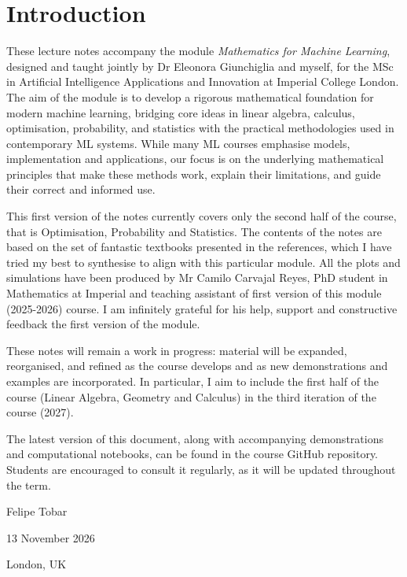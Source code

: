 

\section{Introduction}
\label{cap:intro}


These lecture notes accompany the module \emph{Mathematics for Machine Learning}, designed and taught jointly by Dr Eleonora Giunchiglia and myself, for the MSc in Artificial Intelligence Applications and Innovation at Imperial College London. The aim of the module is to develop a rigorous mathematical foundation for modern machine learning, bridging core ideas in linear algebra, calculus,  optimisation, probability, and statistics with the practical methodologies used in contemporary ML systems. While many ML courses emphasise models, implementation and  applications, our focus is on the underlying mathematical principles that make these methods work, explain their limitations, and guide their correct and informed use.

This first version of the notes currently covers only the second half of the course, that is Optimisation, Probability and Statistics. The contents of the notes are based on the set of fantastic textbooks presented in the references, which I have tried my best to synthesise to align with this particular module. All the plots and simulations have been produced by Mr Camilo Carvajal Reyes, PhD student in Mathematics at Imperial and teaching assistant of first version of this module (2025-2026) course. I am infinitely grateful for his help, support and constructive feedback the first version of the module.

These notes will remain a work in progress: material will be expanded, reorganised, and refined as the course develops and as new demonstrations and examples are incorporated. In particular, I aim to include the first half of the course (Linear Algebra, Geometry and Calculus) in the third iteration of the course (2027).

The latest version of this document, along with accompanying demonstrations and computational notebooks, can be found in the course GitHub repository. Students are encouraged to consult it regularly, as it will be updated throughout the term.



\bigskip
\begin{flushright}
  Felipe Tobar\par
  13 November 2026\par
  London, UK
\end{flushright}

